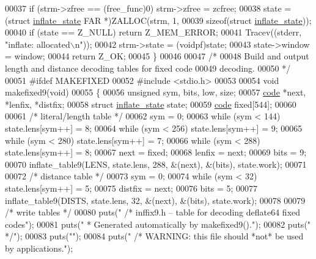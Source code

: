 \begin{DoxyCode}
00037     \textcolor{keywordflow}{if} (strm->zfree == (free\_func)0) strm->zfree = zcfree;
00038     state = (\textcolor{keyword}{struct} \hyperlink{structinflate__state}{inflate\_state} FAR *)ZALLOC(strm, 1,
00039                                                \textcolor{keyword}{sizeof}(\textcolor{keyword}{struct} \hyperlink{structinflate__state}{inflate\_state}));
00040     \textcolor{keywordflow}{if} (state == Z\_NULL) \textcolor{keywordflow}{return} Z\_MEM\_ERROR;
00041     Tracev((stderr, \textcolor{stringliteral}{"inflate: allocated\(\backslash\)n"}));
00042     strm->state = (voidpf)state;
00043     state->window = window;
00044     \textcolor{keywordflow}{return} Z\_OK;
00045 \}
00046 
00047 \textcolor{comment}{/*}
00048 \textcolor{comment}{   Build and output length and distance decoding tables for fixed code}
00049 \textcolor{comment}{   decoding.}
00050 \textcolor{comment}{ */}
00051 \textcolor{preprocessor}{#ifdef MAKEFIXED}
00052 \textcolor{preprocessor}{#include <stdio.h>}
00053 
00054 \textcolor{keywordtype}{void} makefixed9(\textcolor{keywordtype}{void})
00055 \{
00056     \textcolor{keywordtype}{unsigned} sym, bits, low, size;
00057     \hyperlink{structcode}{code} *next, *lenfix, *distfix;
00058     \textcolor{keyword}{struct }\hyperlink{structinflate__state}{inflate\_state} state;
00059     \hyperlink{structcode}{code} fixed[544];
00060 
00061     \textcolor{comment}{/* literal/length table */}
00062     sym = 0;
00063     \textcolor{keywordflow}{while} (sym < 144) state.lens[sym++] = 8;
00064     \textcolor{keywordflow}{while} (sym < 256) state.lens[sym++] = 9;
00065     \textcolor{keywordflow}{while} (sym < 280) state.lens[sym++] = 7;
00066     \textcolor{keywordflow}{while} (sym < 288) state.lens[sym++] = 8;
00067     next = fixed;
00068     lenfix = next;
00069     bits = 9;
00070     inflate\_table9(LENS, state.lens, 288, &(next), &(bits), state.work);
00071 
00072     \textcolor{comment}{/* distance table */}
00073     sym = 0;
00074     \textcolor{keywordflow}{while} (sym < 32) state.lens[sym++] = 5;
00075     distfix = next;
00076     bits = 5;
00077     inflate\_table9(DISTS, state.lens, 32, &(next), &(bits), state.work);
00078 
00079     \textcolor{comment}{/* write tables */}
00080     puts(\textcolor{stringliteral}{"    /* inffix9.h -- table for decoding deflate64 fixed codes"});
00081     puts(\textcolor{stringliteral}{"     * Generated automatically by makefixed9()."});
00082     puts(\textcolor{stringliteral}{"     */"});
00083     puts(\textcolor{stringliteral}{""});
00084     puts(\textcolor{stringliteral}{"    /* WARNING: this file should *not* be used by applications."});

\end{DoxyCode}
